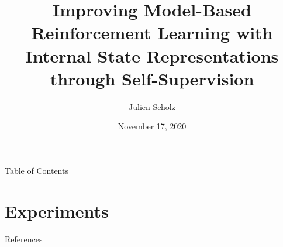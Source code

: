 \documentclass{beamer}
\title{Improving Model-Based Reinforcement Learning with Internal State Representations through Self-Supervision}
\author{Julien Scholz}
\date{November 17, 2020}
\institute{Supervised by Dr. Cornelius Weber and Burhan Hafez}
\begin{document}
\frame{\titlepage}



\begin{frame}{Table of Contents}
  \tableofcontents
\end{frame}



\section{Experiments}



\begin{frame}[allowframebreaks]{References}


\end{frame}
\end{document}
